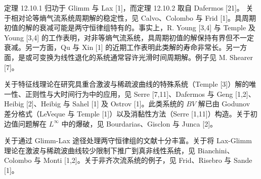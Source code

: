 \documentclass[../../main.tex]{subfiles}
\begin{document}
定理 12.10.1 归功于 Glimm 与 Lax [1]，而定理 12.10.2 取自 Dafermos [21]。
关于相对论等熵气流系统周期解的稳定性，见 Calvo、Colombo 与 Frid [1]。具周期初值的解的衰减可能是两守恒律组特有的。事实上，R. Young [3,4] 与 Temple 及 Young [3,4] 的工作表明，对非等熵气流系统，具周期初值的解保持有界但不一定衰减。另一方面，Qu 与 Xin [1] 的近期工作表明此类解的寿命非常长。另一方面，是或可变换为线性退化的系统通常容许光滑时间周期解。例子见 M. Shearer [7]。

关于特征线理论在研究具重合激波与稀疏波曲线的特殊系统（Temple [3]）解的唯一性、正则性与大时间行为中的应用，见 Serre [7,11]、Dafermos 与 Geng [1,2]、Heibig [2]、Heibig 与 Sahel [1] 及 Ostrov [1]。此类系统的 $BV$ 解已由 Godunov 差分格式（LeVeque 与 Temple [1]）以及消黏性方法（Serre [1,11]）构造。关于初边值问题解在 $L^\infty$ 中的爆破，见 Bourdarias、Gisclon 与 Junca [2]。

关于通过 Glimm-Lax 途径处理两守恒律组的文献十分丰富。关于将 Lax-Glimm 理论在激波与稀疏波曲线较少限制下推广到真非线性系统，见 Bianchini、Colombo 与 Monti [1,2]。关于非齐次流系统的例子，见 Frid、Risebro 与 Sande [1]。
\end{document}
